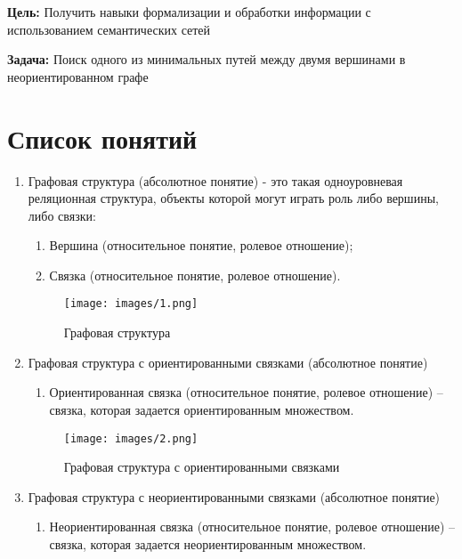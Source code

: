 \textbf{Цель: }Получить навыки формализации и обработки информации с
использованием семантических сетей

\textbf{Задача: }Поиск одного из минимальных путей между двумя вершинами
в неориентированном графе

\section{Список понятий}

\begin{enumerate}
\item
  Графовая структура (абсолютное понятие) - это такая одноуровневая
  реляционная структура, объекты которой могут играть роль либо вершины,
  либо связки:

  \begin{enumerate}
  \item
    Вершина (относительное понятие, ролевое отношение);
  \item
    Связка (относительное понятие, ролевое отношение).
  \end{enumerate}

\begin{figure}[H]
  \centering
  \texttt{[image: images/1.png]}
  \caption{Графовая структура}
\end{figure}

\item
  Графовая структура с ориентированными связками (абсолютное понятие)

  \begin{enumerate}
  \item
    Ориентированная связка (относительное понятие, ролевое отношение)
    -- связка, которая задается ориентированным множеством.
  \end{enumerate}

\begin{figure}[H]
  \centering
  \texttt{[image: images/2.png]}
  \caption{Графовая структура с ориентированными связками}
\end{figure}

\item
  Графовая структура с неориентированными связками (абсолютное понятие)

  \begin{enumerate}
  \item
    Неориентированная связка (относительное понятие, ролевое отношение)
    --связка, которая задается неориентированным множеством.
  \end{enumerate}


\end{enumerate}
